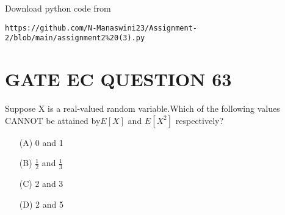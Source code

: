 \documentclass[journal,12pt,twocolumn]{IEEEtran}
\begin{document}
\renewcommand{\thefigure}{\theenumi}
\renewcommand{\thetable}{\theenumi}
Download python code from 
\begin{lstlisting}
https://github.com/N-Manaswini23/Assignment-2/blob/main/assignment2%20(3).py
\end{lstlisting}
%

\section*{GATE EC QUESTION 63}
Suppose X is a real-valued random variable.Which of the following values CANNOT be attained by$ E[X] $ and $ E[X^2] $ respectively?
\begin{enumerate}
\item[(A)] 0 and 1   
\item[(B)] $\frac{1}{2}$ and $\frac{1}{3}$
\item[(C)] 2 and 3
\item[(D)] 2 and 5
\end{enumerate}
\end{document}
